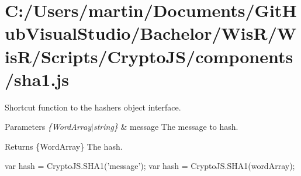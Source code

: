 \hypertarget{_c_1_2_users_2martin_2_documents_2_git_hub_visual_studio_2_bachelor_2_wis_r_2_wis_r_2_scripts_2_53d3ce3bfd2c70be05e0b362863774c0}{}\section{C\+:/\+Users/martin/\+Documents/\+Git\+Hub\+Visual\+Studio/\+Bachelor/\+Wis\+R/\+Wis\+R/\+Scripts/\+Crypto\+J\+S/components/sha1.\+js}
Shortcut function to the hasher\textquotesingle{}s object interface.


\begin{DoxyParams}{Parameters}
{\em \{\+Word\+Array$\vert$string\}} & message The message to hash.\\
\hline
\end{DoxyParams}
\begin{DoxyReturn}{Returns}
\{Word\+Array\} The hash.
\end{DoxyReturn}
\begin{DoxyVerb}var hash = CryptoJS.SHA1('message');
var hash = CryptoJS.SHA1(wordArray);\end{DoxyVerb}



